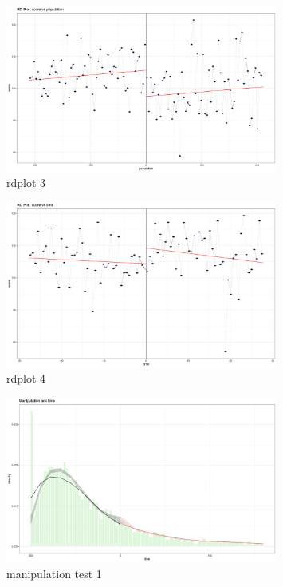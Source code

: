 \documentclass{article}
\begin{document}
\begin{figure}[H]
    \centering
    \includegraphics[width=0.8\textwidth]{figures/rd_cont_3.png}
    \caption{rdplot 3}
    \label{fig:rdcont3}
\end{figure}

\begin{figure}[H]
    \centering
    \includegraphics[width=0.8\textwidth]{figures/rd_cont_4.png}
    \caption{rdplot 4}
    \label{fig:rdcont4}
\end{figure}

\begin{figure}[H]
    \centering
    \includegraphics[width=0.8\textwidth]{figures/manipul_pop.png}
    \caption{manipulation test 1}
    \label{fig:manipul1}
\end{figure}
\end{document}
